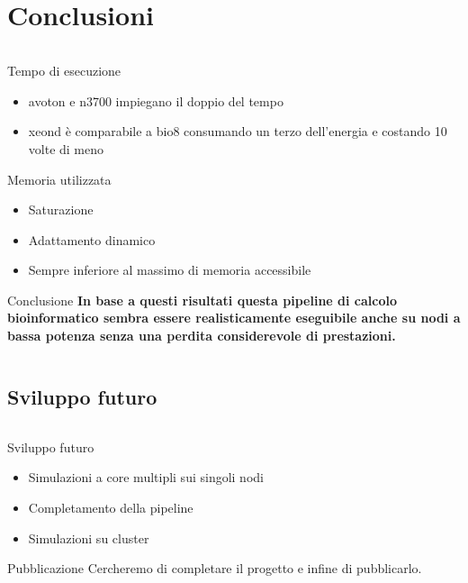\documentclass{beamer}
\begin{document}
\section{Conclusioni}
\begin{frame}
\begin{columns}
\begin{column}{0.8\linewidth}	
\begin{block}{Tempo di esecuzione}
\begin{itemize}
\item avoton e n3700 impiegano il doppio del tempo
\item xeond è comparabile a bio8 consumando un terzo dell'energia e costando 10 volte di meno
\end{itemize}
\end{block}
\begin{block}{Memoria utilizzata}
\begin{itemize}
\item Saturazione
\item Adattamento dinamico
\item Sempre inferiore al massimo di memoria accessibile
\end{itemize}
\end{block}
\begin{block}{Conclusione}
\textbf{In base a questi risultati questa pipeline di calcolo bioinformatico sembra
essere realisticamente eseguibile anche su nodi a bassa potenza senza una
perdita considerevole di prestazioni.}
\end{block}
\end{column}
\end{columns}
\end{frame}

\subsection{Sviluppo futuro}
\begin{frame}
\begin{columns}
\begin{column}{0.8\linewidth}	
\begin{block}{Sviluppo futuro}
\begin{itemize}
\item Simulazioni a core multipli sui singoli nodi
\item Completamento della pipeline
\item Simulazioni su cluster
\end{itemize}
\end{block}
\begin{block}{Pubblicazione}
Cercheremo di completare il progetto e infine di pubblicarlo.
\end{block}
\end{column}
\end{columns}
\end{frame}
\end{document}
